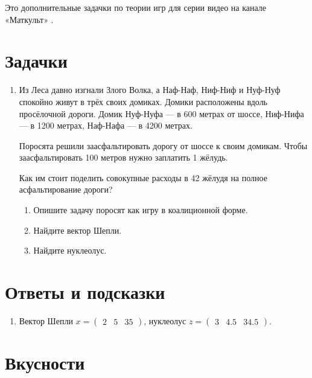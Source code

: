 \documentclass[12pt]{article} %
\theoremstyle{definition} %
\begin{document}
Это дополнительные задачки по теории игр для серии видео на канале «Маткульт» \autocite{mathcult0youtube}.

\section{Задачки}

\begin{enumerate}
\item Из Леса давно изгнали Злого Волка, а Наф-Наф, Ниф-Ниф и Нуф-Нуф спокойно живут в трёх своих домиках. 
Домики расположены вдоль просёлочной дороги. Домик Нуф-Нуфа — в 600 метрах от шоссе, Ниф-Нифа — в 1200 метрах, Наф-Нафа — в 4200 метрах. 

Поросята решили заасфальтировать дорогу от шоссе к своим домикам. 
Чтобы заасфальтировать 100 метров нужно заплатить 1 жёлудь. 

Как им стоит поделить совокупные расходы в 42 жёлудя на полное асфальтирование дороги?

\begin{enumerate}
    \item Опишите задачу поросят как игру в коалиционной форме. 
    \item Найдите вектор Шепли. 
    \item Найдите нуклеолус. 
\end{enumerate}
    
\end{enumerate}



\section{Ответы и подсказки}

\begin{enumerate}
\item Вектор Шепли $x=\begin{pmatrix}
2 & 5 & 35    
\end{pmatrix}$, нуклеолус
$z= \begin{pmatrix}
3 & 4.5 & 34.5    
\end{pmatrix}$.


\end{enumerate}

\section{Вкусности}

\nocite{zadachi4mathcult} 
\nocite{zadachnik4tigers}

\printbibliography[heading=none]
\end{document}
